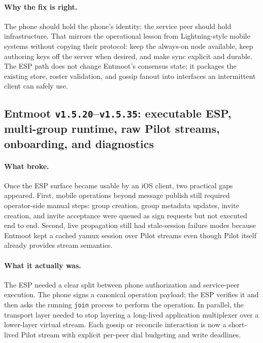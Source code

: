 \documentclass[11pt,a4paper]{article}
\begin{document}
\paragraph{Why the fix is right.} The phone should hold the phone's
identity; the service peer should hold infrastructure. That mirrors the
operational lesson from Lightning-style mobile systems without copying
their protocol: keep the always-on node available, keep authoring keys
off the server when desired, and make sync explicit and durable. The
ESP path does not change Entmoot's consensus state; it packages the
existing store, roster validation, and gossip fanout into interfaces an
intermittent client can safely use.

\subsection{Entmoot \texttt{v1.5.20}--\texttt{v1.5.35}: executable ESP,
multi-group runtime, raw Pilot streams, onboarding, and diagnostics}

\paragraph{What broke.} Once the ESP surface became usable by an iOS
client, two practical gaps appeared. First, mobile operations beyond
message publish still required operator-side manual steps: group
creation, group metadata updates, invite creation, and invite
acceptance were queued as sign requests but not executed end to end.
Second, live propagation still had stale-session failure modes because
Entmoot kept a cached yamux session over Pilot streams even though
Pilot itself already provides stream semantics.

\paragraph{What it actually was.} The ESP needed a clear split between
phone authorization and service-peer execution. The phone signs a
canonical operation payload; the ESP verifies it and then asks the
running \texttt{join} process to perform the operation. In parallel,
the transport layer needed to stop layering a long-lived application
multiplexer over a lower-layer virtual stream. Each gossip or
reconcile interaction is now a short-lived Pilot stream with explicit
per-peer dial budgeting and write deadlines.
\end{document}
